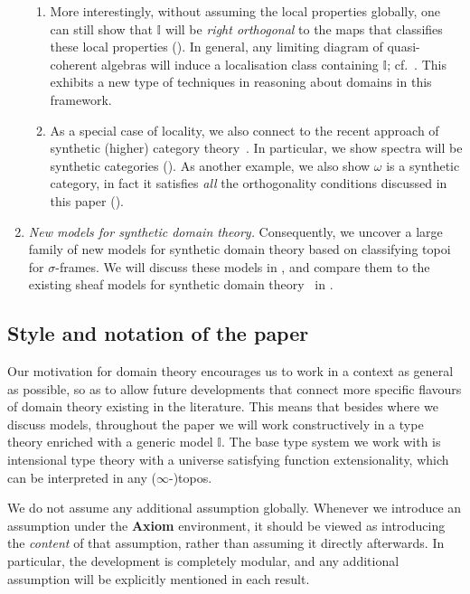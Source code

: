 \documentclass[a4paper,12pt]{amsart}
\theoremstyle{definition}
\newcommand{\mbb}[1]{\mathbb{#1}}
\newcommand{\I}{\mbb I}
\begin{document}
\begin{enumerate}[leftmargin=*]
\begin{enumerate}
    \item  More interestingly, without assuming the local properties globally, one can still show that $\I$ will be \emph{right orthogonal} to the maps that classifies these local properties (). In general, any limiting diagram of quasi-coherent algebras will induce a localisation class containing $\I$; cf.\ . This exhibits a new type of techniques in reasoning about domains in this framework.
    
    \item As a special case of locality, we also connect to the recent approach of synthetic (higher) category theory~\citep{riehl2017type,buchholtz2021synthetic,gratzer2024directed}. In particular, we show spectra will be synthetic categories (). As another example, we also show $\omega$ is a synthetic category, in fact it satisfies \emph{all} the orthogonality conditions discussed in this paper (). 
  \end{enumerate}

  \item \emph{New models for synthetic domain theory.} Consequently, we uncover a large family of new models for synthetic domain theory based on classifying topoi for $\sigma$-frames. We will discuss these models in , and compare them to the existing sheaf models for synthetic domain theory~\citep{FIORE1997151} in .
\end{enumerate}






\subsection{Style and notation of the paper}

Our motivation for domain theory encourages us to work in a context as general as possible, so as to allow future developments that connect more specific flavours of domain theory existing in the literature. This means that besides  where we discuss models, throughout the paper we will work constructively in a type theory enriched with a generic model $\I$. The base type system we work with is intensional type theory with a universe satisfying function extensionality, which can be interpreted in any ($\infty$-)topos. 

We do not assume any additional assumption globally. Whenever we introduce an assumption under the \textbf{Axiom} environment, it should be viewed as introducing the \emph{content} of that assumption, rather than assuming it directly afterwards. In particular, the development is completely modular, and any additional assumption will be explicitly mentioned in each result.
\end{document}
